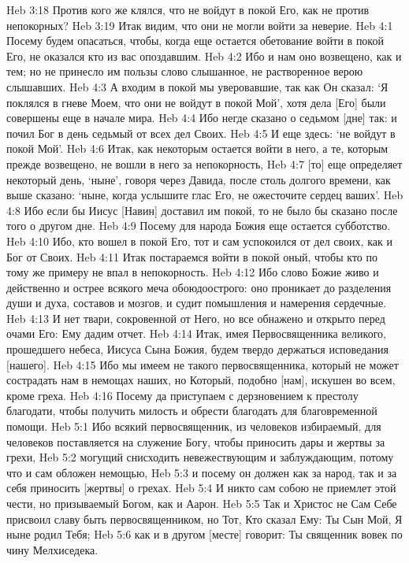 Heb 3:18  Против кого же клялся, что не войдут в покой Его, как не против непокорных?
Heb 3:19  Итак видим, что они не могли войти за неверие.
Heb 4:1  Посему будем опасаться, чтобы, когда еще остается обетование войти в покой Его, не оказался кто из вас опоздавшим.
Heb 4:2  Ибо и нам оно возвещено, как и тем; но не принесло им пользы слово слышанное, не растворенное верою слышавших.
Heb 4:3  А входим в покой мы уверовавшие, так как Он сказал: `Я поклялся в гневе Моем, что они не войдут в покой Мой', хотя дела [Его] были совершены еще в начале мира.
Heb 4:4  Ибо негде сказано о седьмом [дне] так: и почил Бог в день седьмый от всех дел Своих.
Heb 4:5  И еще здесь: `не войдут в покой Мой'.
Heb 4:6  Итак, как некоторым остается войти в него, а те, которым прежде возвещено, не вошли в него за непокорность,
Heb 4:7  [то] еще определяет некоторый день, `ныне', говоря через Давида, после столь долгого времени, как выше сказано: `ныне, когда услышите глас Его, не ожесточите сердец ваших'.
Heb 4:8  Ибо если бы Иисус [Навин] доставил им покой, то не было бы сказано после того о другом дне.
Heb 4:9  Посему для народа Божия еще остается субботство.
Heb 4:10  Ибо, кто вошел в покой Его, тот и сам успокоился от дел своих, как и Бог от Своих.
Heb 4:11  Итак постараемся войти в покой оный, чтобы кто по тому же примеру не впал в непокорность.
Heb 4:12  Ибо слово Божие живо и действенно и острее всякого меча обоюдоострого: оно проникает до разделения души и духа, составов и мозгов, и судит помышления и намерения сердечные.
Heb 4:13  И нет твари, сокровенной от Него, но все обнажено и открыто перед очами Его: Ему дадим отчет.
Heb 4:14  Итак, имея Первосвященника великого, прошедшего небеса, Иисуса Сына Божия, будем твердо держаться исповедания [нашего].
Heb 4:15  Ибо мы имеем не такого первосвященника, который не может сострадать нам в немощах наших, но Который, подобно [нам], искушен во всем, кроме греха.
Heb 4:16  Посему да приступаем с дерзновением к престолу благодати, чтобы получить милость и обрести благодать для благовременной помощи.
Heb 5:1  Ибо всякий первосвященник, из человеков избираемый, для человеков поставляется на служение Богу, чтобы приносить дары и жертвы за грехи,
Heb 5:2  могущий снисходить невежествующим и заблуждающим, потому что и сам обложен немощью,
Heb 5:3  и посему он должен как за народ, так и за себя приносить [жертвы] о грехах.
Heb 5:4  И никто сам собою не приемлет этой чести, но призываемый Богом, как и Аарон.
Heb 5:5  Так и Христос не Сам Себе присвоил славу быть первосвященником, но Тот, Кто сказал Ему: Ты Сын Мой, Я ныне родил Тебя;
Heb 5:6  как и в другом [месте] говорит: Ты священник вовек по чину Мелхиседека.
